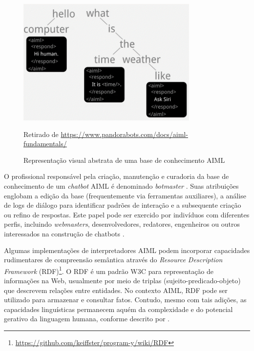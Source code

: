 \documentclass[14pt,a4paper,oneside]{book}
\begin{document}
\begin{figure}
    \centering
    \caption{Representação visual abstrata de uma base de conhecimento AIML}
    \includegraphics[width=0.8\textwidth]{./fig/image12.png} %
    \label{fig:representacaovisualabstrata}
    \vspace{0.2cm} %
    {\footnotesize 
	
	Retirado de \url{https://www.pandorabots.com/docs/aiml-fundamentals/}}
\end{figure}

O profissional responsável pela criação, manutenção e curadoria da base de conhecimento de um \emph{chatbot} AIML é denominado \emph{botmaster} \cite{Wallace2000}. Suas atribuições englobam a edição da base (frequentemente via ferramentas auxiliares), a análise de logs de diálogo para identificar padrões de interação e a subsequente criação ou refino de respostas. Este papel pode ser exercido por indivíduos com diferentes perfis, incluindo \emph{webmasters}, desenvolvedores, redatores, engenheiros ou outros interessados na construção de chatbots \cite{Wallace2000}.

Algumas implementações de interpretadores AIML podem incorporar capacidades rudimentares de compreensão semântica através do \emph{Resource Description Framework} (RDF)\footnote{\url{https://github.com/keiffster/program-y/wiki/RDF}}. O RDF é um padrão W3C para representação de informações na Web, usualmente por meio de triplas (sujeito-predicado-objeto) que descrevem relações entre entidades. No contexto AIML, RDF pode ser utilizado para armazenar e consultar fatos. Contudo, mesmo com tais adições, as capacidades linguísticas permanecem aquém da complexidade e do potencial gerativo da linguagem humana, conforme descrito por \cite{chomsky2002syntactic}.
\end{document}
